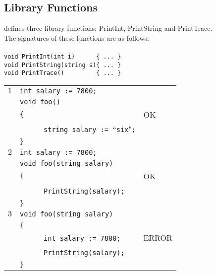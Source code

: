 \documentclass{article}
\begin{document}
\subsection{Library Functions}
\label{subsection_Library_Functions}
\plname defines three library functions: PrintInt, PrintString and PrintTrace.\\
The signatures of these functions are as follows:\\ \\
\verb"void PrintInt(int i)      { ... }"\\ 
\verb"void PrintString(string s){ ... }"\\ 
\verb"void PrintTrace()         { ... }"\\ 
\begin{table}[h]
\centering
\begin{tabular}{|l|l|l|}
\hline
 $1$ & \verb"int salary := 7800;"                            &    \\
     & \verb"void foo()"                                     &    \\
     & \verb"{"                                              & OK \\
     & ~ ~ ~ ~\verb"string salary := "``\verb"six""\verb";"  &    \\
     & \verb"}"                                              &    \\
\hline
 $2$ & \verb"int salary := 7800;"         &    \\
     & \verb"void foo(string salary)"     &    \\
     & \verb"{"                           & OK \\
     & ~ ~ ~ ~\verb"PrintString(salary);" &    \\
     & \verb"}"                           &    \\
\hline
 $3$ & \verb"void foo(string salary)"     &       \\
     & \verb"{"                           &       \\
     & ~ ~ ~ ~\verb"int salary := 7800;"  & ERROR \\
     & ~ ~ ~ ~\verb"PrintString(salary);" &       \\
     & \verb"}"                           &       \\

\end{tabular}
\end{table}
\end{document}
